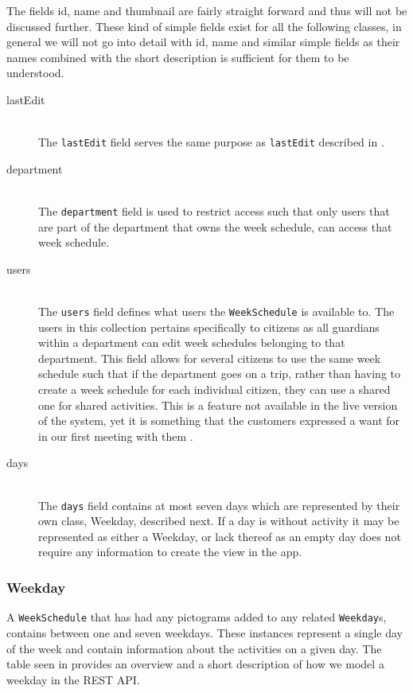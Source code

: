 \noindent
The fields id, name and thumbnail are fairly straight forward and thus will not be discussed further.
These kind of simple fields exist for all the following classes, in general we will not go into detail with id, name and similar simple fields as their names combined with the short description is sufficient for them to be understood.
\begin{description}
    \item [lastEdit] \hfill \\ 
    The \texttt{lastEdit} field serves the same purpose as \texttt{lastEdit} described in .
    \item [department] \hfill \\
    The \texttt{department} field is used to restrict access such that only users that are part of the department that owns the week schedule, can access that week schedule.
    \item [users] \hfill \\
    The \texttt{users} field defines what users the \texttt{WeekSchedule} is available to.
    The users in this collection pertains specifically to citizens as all guardians within a department can edit week schedules belonging to that department.
    This field allows for several citizens to use the same week schedule such that if the department goes on a trip, rather than having to create a week schedule for each individual citizen, they can use a shared one for shared activities.
    This is a feature not available in the live version of the system, yet it is something that the customers expressed a want for in our first meeting with them \citep{GIRAF20161stMeeting}.
    \item [days] \hfill \\
    The \texttt{days} field contains at most seven days which are represented by their own class, Weekday, described next.
    If a day is without activity it may be represented as either a Weekday, or lack thereof as an empty day does not require any information to create the view in the app.
\end{description}

\subsubsection{Weekday}
A \texttt{WeekSchedule} that has had any pictograms added to any related \texttt{Weekday}s, contains between one and seven weekdays.
These \texttt{} instances represent a single day of the week and contain information about the activities on a given day.
The table seen in  provides an overview and a short description of how we model a weekday in the REST API.

